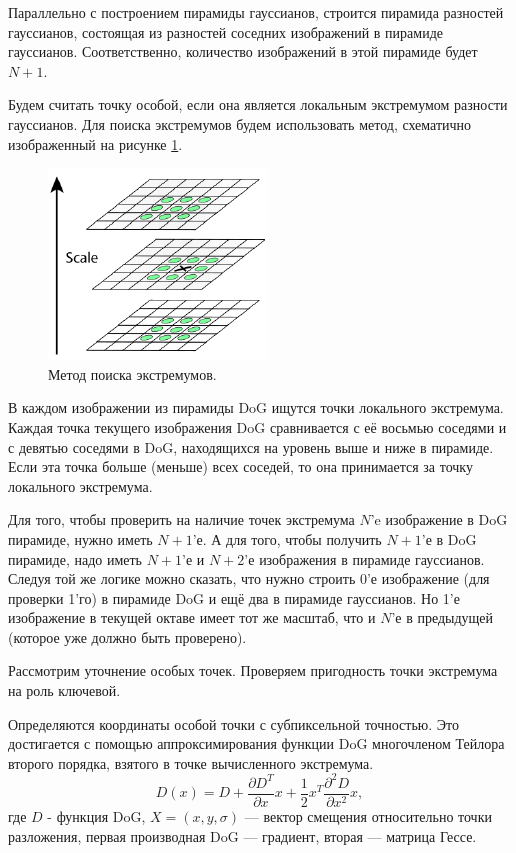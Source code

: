 Параллельно с построением пирамиды гауссианов, строится пирамида разностей
гауссианов, состоящая из разностей соседних изображений в пирамиде
гауссианов. Соответственно, количество изображений в этой пирамиде будет $N+1$.


Будем считать точку особой, если она является локальным экстремумом разности
гауссианов. Для поиска экстремумов будем использовать метод, схематично
изображенный на рисунке \ref{fig:sift-extr}.

\begin{figure}[h!]
  \centering
  \includegraphics[height=.2\textheight]{sift-extremum.png}
  \caption{Метод поиска экстремумов.}
  \label{fig:sift-extr} 
\end{figure}

В каждом изображении из пирамиды DoG ищутся точки локального экстремума. Каждая
точка текущего изображения DoG сравнивается с её восьмью соседями и с девятью
соседями в DoG, находящихся на уровень выше и ниже в пирамиде. Если эта точка
больше (меньше) всех соседей, то она принимается за точку локального экстремума.


Для того, чтобы проверить на наличие точек экстремума $N$'e изображение в DoG
пирамиде, нужно иметь $N+1$'е. А для того, чтобы получить $N+1$'е в DoG
пирамиде, надо иметь $N+1$'е и $N+2$'е изображения в пирамиде гауссианов. Следуя
той же логике можно сказать, что нужно строить 0'е изображение (для проверки
1'го) в пирамиде DoG и ещё два в пирамиде гауссианов. Но 1'е изображение в
текущей октаве имеет тот же масштаб, что и $N$'е в предыдущей (которое уже
должно быть проверено).


Рассмотрим уточнение особых точек. Проверяем пригодность точки экстремума на
роль ключевой.


Определяются координаты особой точки с субпиксельной точностью. Это достигается
с помощью аппроксимирования функции DoG многочленом Тейлора второго порядка,
взятого в точке вычисленного экстремума.
$$ D(x) = D + \frac{\partial D^T}{\partial x}x + \frac{1}{2}x^T\frac{\partial^2D}{\partial x^2}x, $$
где $D$ - функция DoG, $X = (x,y,\sigma)$ --- вектор смещения относительно точки
разложения, первая производная DoG --- градиент, вторая --- матрица Гессе.


